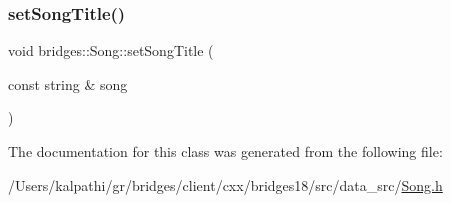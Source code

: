 \mbox{\label{classbridges_1_1_song_a18e3a6bd5f424a6dadf529bed446a0d0}} 
\subsubsection{\texorpdfstring{set\+Song\+Title()}{setSongTitle()}}
{\footnotesize\ttfamily void bridges\+::\+Song\+::set\+Song\+Title (\begin{DoxyParamCaption}\item[{const string \&}]{song }\end{DoxyParamCaption})\hspace{0.3cm}{\ttfamily [inline]}}



The documentation for this class was generated from the following file\+:\begin{DoxyCompactItemize}
\item 
/\+Users/kalpathi/gr/bridges/client/cxx/bridges18/src/data\+\_\+src/\mbox{\hyperlink{_song_8h}{Song.\+h}}\end{DoxyCompactItemize}
